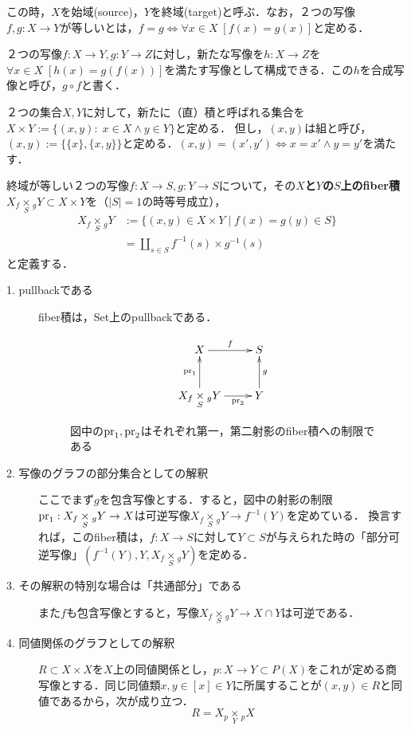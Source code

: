 \documentclass[uplatex, dvipdfmx]{jsreport}
\begin{document}
この時，$X$を始域(source)，$Y$を終域(target)と呼ぶ．なお，２つの写像$f,g:X\rightarrow Y$が等しいとは，$f=g\Longleftrightarrow \forall x \in X \; [f(x)=g(x)]$と定める．
\begin{definition}[写像の合成]
    ２つの写像$f:X\rightarrow Y, g:Y\rightarrow Z$に対し，新たな写像を$h:X\rightarrow Z$を$\forall x \in X \; [h(x)=g(f(x))]$を満たす写像として構成できる．この$h$を合成写像と呼び，$g\circ f$と書く．
\end{definition}
\begin{definition}[集合の積]
    ２つの集合$X,Y$に対して，新たに（直）積と呼ばれる集合を$X\times Y:=\{ (x,y) :\; x\in X \wedge y\in Y\}$と定める．
    但し，$(x,y)$は組と呼び，$(x,y):=\{\{x\},\{x,y\}\}$と定める．$(x,y)=(x',y')\Longleftrightarrow x=x'\wedge y=y'$を満たす．
\end{definition}

\begin{definition}[fiber積]
    終域が等しい２つの写像$f:X\rightarrow S, g:Y\rightarrow S$について，その\textbf{$X$と$Y$の$S$上のfiber積}$X_f\underset{S}{\times}{}_gY\subset X\times Y$を（$|S|=1$の時等号成立），
    \begin{align*}
        X_f\underset{S}{\times}{}_gY&:=\{ (x,y)\in X\times Y\mid f(x)=g(y)\in S \}\\
        &=\coprod_{s\in S}f^{-1}(s)\times g^{-1}(s)
    \end{align*}
    と定義する．
\end{definition}
\begin{example}[fiber積の立ち位置を他の概念との連関の中で把握する]\mbox{}
    \begin{description}
        \item[1. pullbackである] fiber積は，Set上のpullbackである．
        \begin{figure}[h]
            \[\xymatrix{
            X\ar[r]^-f&S\\
            {X_f\underset{S}{\times}{}_{g}Y}\ar[u]^-{\pr_1}\ar[r]_-{\pr_2}&Y\ar[u]_-g
        }\]
        \caption{図中の$\mathrm{pr}_1,\mathrm{pr}_2$はそれぞれ第一，第二射影のfiber積への制限である}
        \end{figure}
        \item[2. 写像のグラフの部分集合としての解釈]
        ここでまず$g$を包含写像とする．すると，図中の射影の制限$\mathrm{pr}_1:X_f\underset{S}{\times}{}_{g}Y\to X$は可逆写像$X_f\underset{S}{\times}{}_{g}Y\to f^{-1}(Y)$を定めている．
        換言すれば，このfiber積は，$f:X\to S$に対して$Y\subset S$が与えられた時の「部分可逆写像」$(f^{-1}(Y),Y,X_f\underset{S}{\times}{}_{g}Y)$を定める．
        \item[3. その解釈の特別な場合は「共通部分」である]
        また$f$も包含写像とすると，写像$X_f\underset{S}{\times}{}_{g}Y\to X\cap Y$は可逆である． 
        \item[4. 同値関係のグラフとしての解釈]
        $R\subset X\times X$を$X$上の同値関係とし，$p:X\to Y\subset P(X)$をこれが定める商写像とする．同じ同値類$x,y\in [x]\in Y$に所属することが$(x,y)\in R$と同値であるから，次が成り立つ．
        \[ R=X_p\underset{Y}{\times}{}_{p}X \]
    \end{description}
\end{example}
\end{document}
